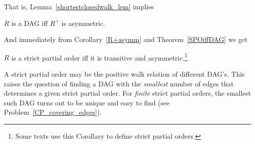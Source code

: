 That is, Lemma~\ref{shortestclosedwalk_lem} implies
\begin{corollary}\label{R+asymm}
$R$ is a DAG iff $R^+$ is asymmetric.
\end{corollary}

And immediately from Corollary~\ref{R+asymm} and Theorem~\ref{SPOiffDAG}
we get
\begin{corollary}
$R$ is a strict partial order iff it is transitive and
  asymmetric.\footnote{Some texts use this Corollary to define strict
    partial orders.}
\end{corollary}


\iffalse
can be an economical way to represent partial orders.  For example,
the \emph{direct prerequisite} relation between MIT subjects in
Chapter~\ref{partial-order-chapter} was used to determine the partial
order of indirect prerequisites on subjects.  This indirect
prerequisite partial order is precisely the positive length walk
relation of the direct prerequisites.

\fi

A strict partial order may be the positive walk relation of different
DAG's.  \iffalse The divisibility partial order can also be more
economically represented by the walk relation in a DAG.
\hyperdef{divisibility}{DAG}{A DAG whose \emph{path} relation is
  divisibility} on $\set{1,2,\dots,12}$ is shown in
Figure~\ref{fig:divisibility-DAG}; the arrowheads are omitted in the
Figure, and edges are understood to point upwards.

\begin{figure}
\graphic{divi2}
\caption{A DAG whose Walk Relation is Divisibility on $\set{1,2,\dots,12}$.}
\label{fig:divisibility-DAG}
\end{figure}

If we're using a DAG to represent a partial order---so all we care
about is the the walk relation of the DAG---we could replace the DAG
with any other DAG with the same walk relation.  \fi
This raises the question of finding a DAG with the \emph{smallest}
number of edges that determines a given strict partial order.  For
\emph{finite} strict partial orders, the smallest such DAG turns out
to be unique and easy to find (see Problem~\ref{CP_covering_edges}).

\begin{problems}
\practiceproblems
{}

\classproblems
{}

\homeworkproblems
{}

\examproblems
{}

\end{problems}

